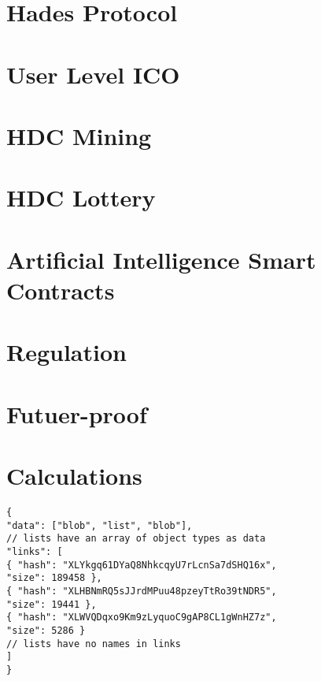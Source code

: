 \documentclass[
a4paper, %
11pt, %
onecolumn, %
openany, %
]{memoir}
\begin{document}
\chapter{Hades Protocol}
\lipsum[50 -65]
\chapter{User Level ICO}
\lipsum[60 -75]
\chapter{HDC Mining}
\lipsum[70 -85]
\chapter{HDC Lottery}
\lipsum[80 -95]
\chapter{Artificial Intelligence Smart Contracts}
\lipsum[90-105]
\chapter{Regulation}
\lipsum[100 - 105]
\chapter{Futuer-proof}
\lipsum[110 -125]
\appendix
\chapter{Calculations}
\begin{verbatim}
{
"data": ["blob", "list", "blob"],
// lists have an array of object types as data
"links": [
{ "hash": "XLYkgq61DYaQ8NhkcqyU7rLcnSa7dSHQ16x",
"size": 189458 },
{ "hash": "XLHBNmRQ5sJJrdMPuu48pzeyTtRo39tNDR5",
"size": 19441 },
{ "hash": "XLWVQDqxo9Km9zLyquoC9gAP8CL1gWnHZ7z",
"size": 5286 }
// lists have no names in links
]
}
\end{verbatim}
\end{document}
